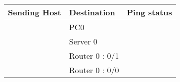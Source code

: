 \documentclass[a4paper,11pt]{article}
\begin{document}
\begin{enumerate}
\begin{enumerate}






                    \begin{table}[H]
                        \centering
                        \begin{tabular}{| m{9em}| m{12em}| m{9em} |}
                            \hline
                            {\cellcolor[rgb]{0.333,0.686,1}}\textbf{Sending Host}                & \textbf{Destination} & \multicolumn{1}{l|}{\textbf{Ping status}}                                               \\
                            \hline
                            {\cellcolor[rgb]{0.333,0.686,1}}                                     & PC0                  & \multicolumn{1}{l|}{{\cellcolor[rgb]{1,0.141,0.059}}}                                   \\
                            \hhline{|>{\arrayrulecolor[rgb]{0.333,0.686,1}}->{\arrayrulecolor{black}}->{\arrayrulecolor[rgb]{1,0.141,0.059}}->{\arrayrulecolor{black}}|}
                            {\cellcolor[rgb]{0.333,0.686,1}}                                     & Server 0             & \multicolumn{1}{l|}{{\cellcolor[rgb]{1,0.141,0.059}}}                                   \\
                            \hhline{|>{\arrayrulecolor[rgb]{0.333,0.686,1}}->{\arrayrulecolor{black}}->{\arrayrulecolor[rgb]{1,0.141,0.059}}->{\arrayrulecolor{black}}|}
                            {\cellcolor[rgb]{0.333,0.686,1}}                                     & Router 0 : 0/1       & \multicolumn{1}{l|}{{\cellcolor[rgb]{1,0.141,0.059}}}                                   \\
                            \hhline{|>{\arrayrulecolor[rgb]{0.333,0.686,1}}->{\arrayrulecolor{black}}->{\arrayrulecolor[rgb]{1,0.141,0.059}}->{\arrayrulecolor{black}}|}
                            {\cellcolor[rgb]{0.333,0.686,1}}                                     & Router 0 : 0/0       & \multicolumn{1}{l|}{{\cellcolor[rgb]{1,0.141,0.059}}}                                   \\

\end{tabular}
\end{table}
\end{enumerate}
\end{enumerate}
\end{document}
